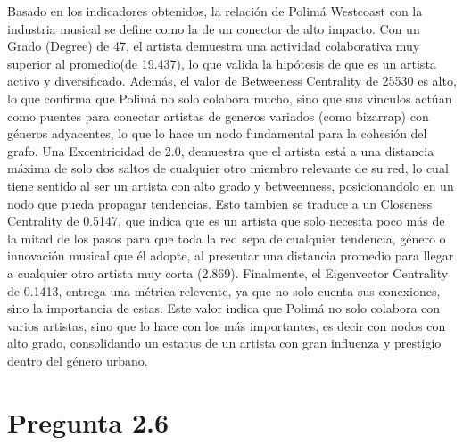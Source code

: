 \documentclass[
	spanish, %
	letterpaper, oneside
]{article}
\begin{document}
Basado en los indicadores obtenidos, la relación de Polimá Westcoast con la industria musical se define como la de un conector de alto impacto. Con un Grado (Degree) de 47, el artista demuestra una actividad colaborativa muy superior al promedio(de 19.437), lo que valida la hipótesis de que es un artista activo y diversificado. Además, el valor de Betweeness Centrality de 25530 es alto, lo que confirma que Polimá no solo colabora mucho, sino que sus vínculos actúan como puentes para conectar artistas de generos variados (como bizarrap) con géneros adyacentes, lo que lo hace un nodo fundamental para la cohesión del grafo. Una Excentricidad de 2.0, demuestra que el artista está a una distancia máxima de solo dos saltos de cualquier otro miembro relevante de su red, lo cual tiene sentido al ser un artista con alto grado y betweenness, posicionandolo en un nodo que pueda propagar tendencias. Esto tambien se traduce a un Closeness Centrality de 0.5147, que indica que es un artista que solo necesita poco más de la mitad de los pasos para que toda la red sepa de cualquier tendencia, género o innovación musical que él adopte, al presentar una distancia promedio para llegar a cualquier otro artista muy corta (2.869). Finalmente, el Eigenvector Centrality de 0.1413, entrega una métrica relevente, ya que no solo cuenta sus conexiones, sino la importancia de estas. Este valor indica que Polimá no solo colabora con varios artistas, sino que lo hace con los más importantes, es decir con nodos con alto grado, consolidando un estatus de un artista con gran influenza y prestigio dentro del género urbano.

\section{Pregunta 2.6}
\end{document}
